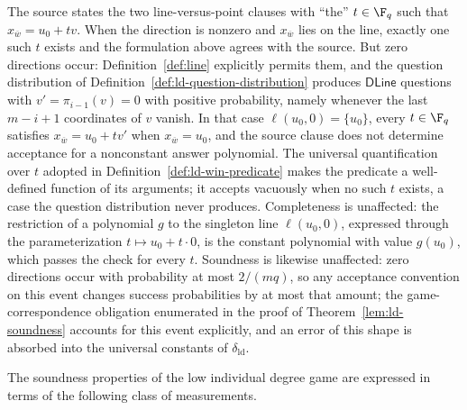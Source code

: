 \begin{remark}\label{rem:ld-win-zero-direction}
	The source states the two line-versus-point clauses with ``the'' $t \in \F_q$ such that $x_{\overline w} = u_0 + t v$. When the direction is nonzero and $x_{\overline w}$ lies on the line, exactly one such $t$ exists and the formulation above agrees with the source. But zero directions occur: Definition~\ref{def:line} explicitly permits them, and the question distribution of Definition~\ref{def:ld-question-distribution} produces $\mathsf{DLine}$ questions with $v' = \pi_{i-1}(v) = 0$ with positive probability, namely whenever the last $m - i + 1$ coordinates of $v$ vanish. In that case $\ell(u_0, 0) = \{u_0\}$, every $t \in \F_q$ satisfies $x_{\overline w} = u_0 + t v'$ when $x_{\overline w} = u_0$, and the source clause does not determine acceptance for a nonconstant answer polynomial. The universal quantification over $t$ adopted in Definition~\ref{def:ld-win-predicate} makes the predicate a well-defined function of its arguments; it accepts vacuously when no such $t$ exists, a case the question distribution never produces. Completeness is unaffected: the restriction of a polynomial $g$ to the singleton line $\ell(u_0,0)$, expressed through the parameterization $t \mapsto u_0 + t \cdot 0$, is the constant polynomial with value $g(u_0)$, which passes the check for every $t$. Soundness is likewise unaffected: zero directions occur with probability at most $2/(mq)$, so any acceptance convention on this event changes success probabilities by at most that amount; the game-correspondence obligation enumerated in the proof of Theorem~\ref{lem:ld-soundness} accounts for this event explicitly, and an error of this shape is absorbed into the universal constants of $\delta_{\mathrm{ld}}$.
\end{remark}

The soundness properties of the low individual degree game are expressed in terms of the following class of measurements.

